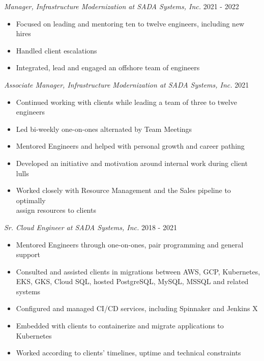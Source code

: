 \documentclass[line]{docs/resume/res}
\begin{document}
\begin{resume}
  {\sl Manager, Infrastructure Modernization at SADA Systems, Inc.} \hfill 2021 - 2022
  \begin{itemize} \itemsep -2pt
    \item Focused on leading and mentoring ten to twelve engineers, including new hires
    \item Handled client escalations
    \item Integrated, lead and engaged an offshore team of engineers
  \end{itemize}

  {\sl Associate Manager, Infrastructure Modernization at SADA Systems, Inc.} \hfill 2021
  \begin{itemize} \itemsep -2pt
    \item Continued working with clients while leading a team of three to twelve engineers
    \item Led bi-weekly one-on-ones alternated by Team Meetings
    \item Mentored Engineers and helped with personal growth and career pathing
    \item Developed an initiative and motivation around internal work during client lulls
    \item Worked closely with Resource Management and the Sales pipeline to optimally \\
      assign resources to clients
  \end{itemize}

  {\sl Sr. Cloud Engineer at SADA Systems, Inc.} \hfill 2018 - 2021
  \begin{itemize} \itemsep -2pt
    \item Mentored Engineers through one-on-ones, pair programming and general support
    \item Consulted and assisted clients in migrations between AWS, GCP, Kubernetes, \\
      EKS, GKS, Cloud SQL, hosted PostgreSQL, MySQL, MSSQL and related systems
    \item Configured and managed CI/CD services, including Spinnaker and Jenkins X
    \item Embedded with clients to containerize and migrate applications to Kubernetes
    \item Worked according to clients' timelines, uptime and technical constraints
  \end{itemize}


\end{resume}
\end{document}
